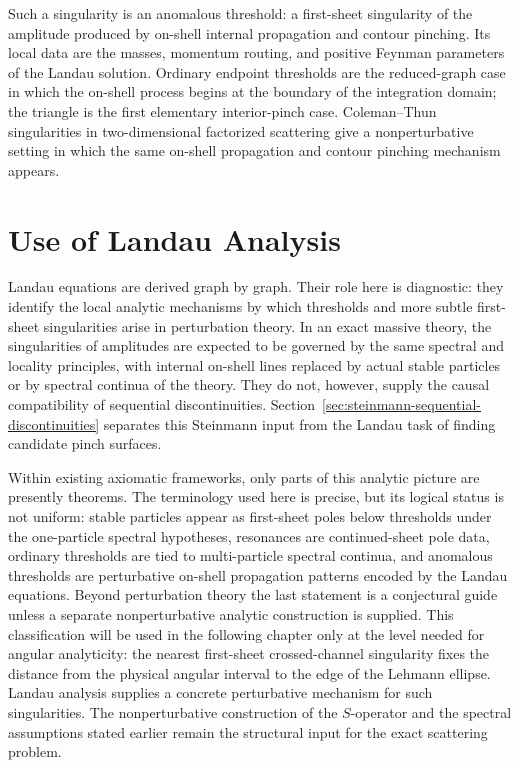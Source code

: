 Such a singularity is an anomalous threshold: a first-sheet singularity of
the amplitude produced by on-shell internal propagation and contour pinching.
Its local data are the masses, momentum routing, and positive Feynman
parameters of the Landau solution.  Ordinary endpoint thresholds are the
reduced-graph case in which the on-shell process begins at the boundary of the
integration domain; the triangle is the first elementary interior-pinch case.
Coleman--Thun singularities in two-dimensional factorized scattering give a
nonperturbative setting in which the same on-shell propagation and contour
pinching mechanism appears.

\section{Use of Landau Analysis}

Landau equations are derived graph by graph. Their role here is diagnostic:
they identify the local analytic mechanisms by which thresholds and more
subtle first-sheet singularities arise in perturbation theory. In an exact
massive theory, the singularities of amplitudes are expected to be governed by
the same spectral and locality principles, with internal on-shell lines
replaced by actual stable particles or by spectral continua of the theory.
They do not, however, supply the causal compatibility of sequential
discontinuities.  Section~\ref{sec:steinmann-sequential-discontinuities}
separates this Steinmann input from the Landau task of finding candidate pinch
surfaces.

Within existing axiomatic frameworks, only parts of this analytic picture are
presently theorems.  The terminology used here is precise, but its logical
status is not uniform: stable particles appear as first-sheet poles below
thresholds under the one-particle spectral hypotheses, resonances are
continued-sheet pole data, ordinary thresholds are tied to multi-particle
spectral continua, and anomalous thresholds are perturbative on-shell
propagation patterns encoded by the Landau equations.  Beyond perturbation
theory the last statement is a conjectural guide unless a separate
nonperturbative analytic construction is supplied.  This classification will
be used in the following chapter only at the level needed for angular
analyticity: the nearest first-sheet crossed-channel singularity fixes the
distance from the physical angular interval to the edge of the Lehmann ellipse.
Landau analysis supplies a concrete perturbative mechanism for such
singularities.  The nonperturbative construction of the \(S\)-operator and the
spectral assumptions stated earlier remain the structural input for the exact
scattering problem.
